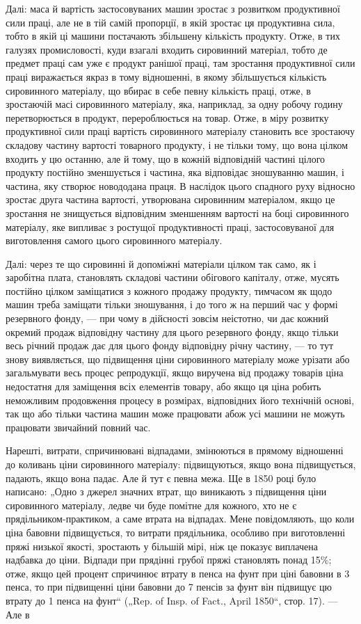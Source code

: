 Далі: маса й вартість застосовуваних машин зростає з розвитком
продуктивної сили праці, але не в тій самій пропорції,
в якій зростає ця продуктивна сила, тобто в якій ці машини
постачають збільшену кількість продукту. Отже, в тих галузях
промисловості, куди взагалі входить сировинний матеріал, тобто
де предмет праці сам уже є продукт ранішої праці, там зростання
продуктивної сили праці виражається якраз в тому відношенні,
в якому збільшується кількість сировинного матеріалу,
що вбирає в себе певну кількість праці, отже, в зростаючій масі
сировинного матеріалу, яка, наприклад, за одну робочу годину перетворюється
в продукт, перероблюється на товар. Отже, в
міру розвитку продуктивної сили праці вартість сировинного
матеріалу становить все зростаючу складову частину вартості
товарного продукту, і не тільки тому, що вона цілком входить
у цю останню, але й тому, що в кожній відповідній частині
цілого продукту постійно зменшується і частина, яка відповідає
зношуванню машин, і частина, яку створює новододана праця.
В наслідок цього спадного руху відносно зростає друга частина
вартості, утворювана сировинним матеріалом, якщо це зростання
не знищується відповідним зменшенням вартості на боці сировинного
матеріалу, яке випливає з ростущої продуктивності
праці, застосовуваної для виготовлення самого цього сировинного
матеріалу.

Далі: через те що сировинні й допоміжні матеріали цілком
так само, як і заробітна плата, становлять складові частини
обігового капіталу, отже, мусять постійно цілком заміщатися
з кожного продажу продукту, тимчасом як щодо машин треба
заміщати тільки зношування, і до того ж на перший час у формі
резервного фонду, — при чому в дійсності зовсім неістотно, чи
дає кожний окремий продаж відповідну частину для цього
резервного фонду, якщо тільки весь річний продаж дає для
цього фонду відповідну річну частину, — то тут знову виявляється,
що підвищення ціни сировинного матеріалу може урізати
або загальмувати весь процес репродукції, якщо виручена
від продажу товарів ціна недостатня для заміщення всіх елементів
товару, або якщо ця ціна робить неможливим продовження
процесу в розмірах, відповідних його технічній основі,
так що або тільки частина машин може працювати абож усі
машини не можуть працювати звичайний повний час.

Нарешті, витрати, спричинювані відпадами, змінюються в прямому
відношенні до коливань ціни сировинного матеріалу: підвищуються,
якщо вона підвищується, падають, якщо вона падає. Але
й тут є певна межа. Ще в 1850 році було написано: „Одно з джерел
значних втрат, що виникають з підвищення ціни сировинного
матеріалу, ледве чи буде помітне для кожного, хто не є
прядільником-практиком, а саме втрата на відпадах. Мене повідомляють,
що коли ціна бавовни підвищується, то витрати прядільника,
особливо при виготовленні пряжі низької якості, зростають
у більшій мірі, ніж це показує виплачена надбавка до
ціни. Відпади при прядінні грубої пряжі становлять понад 15\%;
отже, якщо цей процент спричинює втрату в  пенса на фунт
при ціні бавовни в 3  пенса, то при підвищенні ціни бавовни
до 7 пенсів за фунт він підвищує цю втрату до 1 пенса на
фунт“ („Rep. of Insp. of Fact., April 1850“, стор. 17). — Але в
\parbreak{}  %
